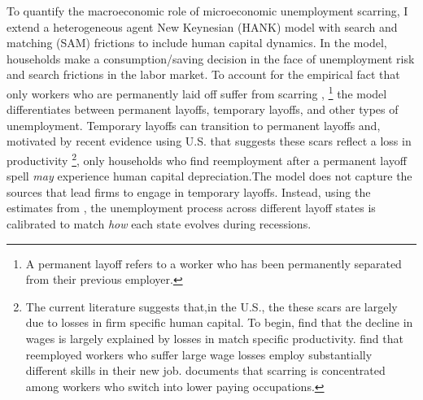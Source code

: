 To quantify the macroeconomic role of microeconomic unemployment scarring, I extend a heterogeneous agent New Keynesian (HANK) model with search and matching (SAM) frictions to include human capital dynamics. In the model, households make a consumption/saving decision in the face of unemployment risk and search frictions in the labor market. To account for the empirical fact that only workers who are permanently laid off suffer from scarring \citep{ Fujita2016}, \footnote{A permanent layoff refers to a worker who has been permanently separated from their previous employer.} the model differentiates between permanent layoffs, temporary layoffs, and other types of unemployment. Temporary layoffs can transition to permanent layoffs and, motivated by recent evidence using U.S. that suggests these scars reflect a loss in productivity \footnote{ The current literature suggests that,in the U.S., the these scars are largely due to losses in firm specific human capital. To begin, \cite{Lachowska2020} find that the decline in wages is largely explained by losses in match specific productivity. \cite{Poletaev2008} find that reemployed workers who suffer large wage losses employ substantially different skills in their new job. \cite{Huckfeldt2022} documents that scarring is concentrated among workers who switch into lower paying occupations.}, only households who find reemployment after a permanent layoff spell \textit{may} experience human capital depreciation.The model does not capture the sources that lead firms to engage in temporary layoffs. Instead, using the estimates from \cite{Gertler2022}, the unemployment process across different layoff states is calibrated to match \textit{how} each state evolves during recessions.%

